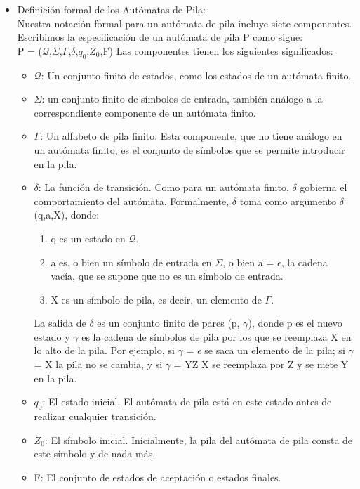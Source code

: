 \documentclass[12pt,a4paper,spanish]{book}
\begin{document}
\begin{itemize}
\item Definici\'on formal de los Aut\'omatas de Pila:\\

Nuestra notaci\'on formal para un aut\'omata de pila incluye siete componentes.
Escribimos la especificaci\'on de un aut\'omata de pila P como sigue:\\

P = ($\mathcal{Q}$,$\Sigma$,$\Gamma$,$\delta$,$q_{0}$,$Z_{0}$,F)
Las componentes tienen los siguientes significados:
\begin{itemize}
\item $\mathcal{Q}$: Un conjunto finito de estados, como los estados de un aut\'omata finito.
\item $\Sigma$: un conjunto finito de s\'imbolos de entrada, tambi\'en an\'alogo a la
correspondiente componente de un aut\'omata finito.
\item $\Gamma$: Un alfabeto de pila finito. Esta componente, que no tiene an\'alogo
en un aut\'omata finito, es el conjunto de s\'imbolos que se permite introducir en la pila.
\item $\delta$: La funci\'on de transici\'on. Como para un aut\'omata finito, $\delta$
gobierna el comportamiento del aut\'omata. Formalmente, $\delta$ toma como
argumento $\delta$(q,a,X), donde:
\begin{enumerate}
\item q es un estado en $\mathcal{Q}$.
\item a es, o bien un s\'imbolo de entrada en $\Sigma$, o bien a = $\epsilon$, la
cadena vac\'ia, que se supone que no es un s\'imbolo de entrada.
\item X es un s\'imbolo de pila, es decir, un elemento de $\Gamma$.
\end{enumerate}
La salida de $\delta$ es un conjunto finito de pares (p, $\gamma$), donde p es el
nuevo estado y $\gamma$ es la cadena de s\'imbolos de pila por los que se reemplaza
X en lo alto de la pila. Por ejemplo, si $\gamma$ = $\epsilon$ se saca un elemento de
la pila; si $\gamma$ = X la pila no se cambia, y si $\gamma$ = YZ X se reemplaza por
Z y se mete Y en la pila.
\item $q_{0}$: El estado inicial. El aut\'omata de pila est\'a en este estado antes de
realizar cualquier transici\'on.
\item $Z_{0}$: El s\'imbolo inicial. Inicialmente, la pila del aut\'omata de pila consta de
este s\'imbolo y de nada m\'as.
\item F: El conjunto de estados de aceptaci\'on o estados finales.
\end{itemize}


\end{itemize}
\end{document}
